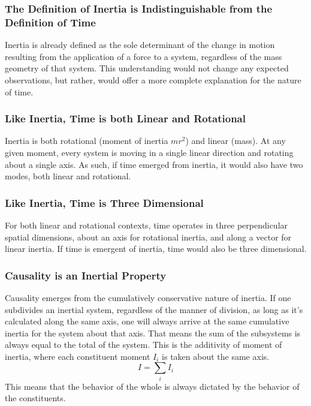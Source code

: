 \documentclass[twoside,twocolumn,9pt,fleqn]{article}
\begin{document}
\subsubsection{The Definition of Inertia is Indistinguishable from the Definition of Time}
Inertia is already defined as the sole determinant of the change in motion resulting from the application of a force to a system, regardless of the mass geometry of that system. This understanding would not change any expected observations, but rather, would offer a more complete explanation for the nature of time.

\subsubsection{Like Inertia, Time is both Linear and Rotational}
Inertia is both rotational (moment of inertia $mr^2$) and linear (mass). At any given moment, every system is moving in a single linear direction and rotating about a single axis. As such, if time emerged from inertia, it would also have two modes, both linear and rotational. 

\subsubsection{Like Inertia, Time is Three Dimensional}
For both linear and rotational contexts, time operates in three perpendicular spatial dimensions, about an axis for rotational inertia, and along a vector for linear inertia. If time is emergent of inertia, time would also be three dimensional.

\subsubsection{Causality is an Inertial Property}
Causality emerges from the cumulatively conservative nature of inertia. If one subdivides an inertial system, regardless of the manner of division, as long as it's calculated along the same axis, one will always arrive at the same cumulative inertia for the system about that axis. That means the sum of the subsystems is always equal to the total of the system. This is the additivity of moment of inertia\cite{goldstein2002}, where each constituent moment $I_i$ is taken about the same axis.
\begin{equation}
I = \sum_i I_i
\end{equation}
This means that the behavior of the whole is always dictated by the behavior of the constituents.
\end{document}
